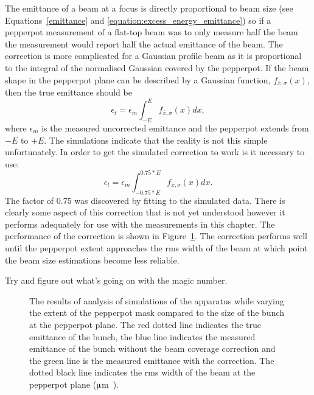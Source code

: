 The emittance of a beam at a focus is directly proportional to beam size (see Equations~\ref{emittance} and \ref{equation:excess_energy_emittance}) so if a pepperpot measurement of a flat-top beam was to only measure half the beam the measurement would report half the actual emittance of the beam.
The correction is more complicated for a Gaussian profile beam as it is proportional to the integral of the normalised Gaussian covered by the pepperpot.
If the beam shape in the pepperpot plane can be described by a Gaussian function, $f_{\bar{x},\sigma}(x)$, then the true emittance should be
\begin{equation}
\epsilon_t = \epsilon_m \int_{-E}^{E} f_{\bar{x}, \sigma}(x) dx,
\end{equation}
where $\epsilon_m$ is the measured uncorrected emittance and the pepperpot extends from $-E$ to $+E$.
The simulations indicate that the reality is not this simple unfortunately. In order to get the simulated correction to work is it necessary to use:
\begin{equation}
\epsilon_t = \epsilon_m \int_{-0.75*E}^{0.75*E} f_{\bar{x}, \sigma}(x) dx.
\end{equation}
The factor of 0.75 was discovered by fitting to the simulated data.
There is clearly some aspect of this correction that is not yet understood however it performs adequately for use with the measurements in this chapter.
The performance of the correction is shown in Figure~\ref{figure:pepperpot_extent}.
The correction performs well until the pepperpot extent approaches the \gls{rms} width of the beam at which point the beam size estimations become less reliable.

{\color{red}
Try and figure out what's going on with the magic number.
}

\begin{figure}
    \center
    
    \caption[Results of a simulation investigating the efficacy of the beam coverage correction for various beam sizes.]{The results of analysis of simulations of the apparatus while varying the extent of the pepperpot mask compared to the size of the bunch at the pepperpot plane.
    The red dotted line indicates the true emittance of the bunch, the blue line indicates the measured emittance of the bunch without the beam coverage correction and the green line is the measured emittance with the correction.
    The dotted black line indicates the \gls{rms} width of the beam at the pepperpot plane (\unit[873]{$\muup$m}).}
    \label{figure:pepperpot_extent}
\end{figure}

